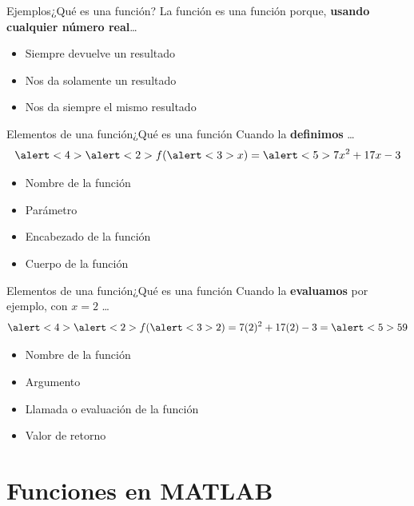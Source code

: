 \documentclass[spanish, c]{beamer}
\begin{document}
\begin{frame}{Ejemplos}{¿Qué es una función?}
    La función  es una función porque, \textbf{usando cualquier número real}\dots \pause

    \bigskip

    \begin{itemize}[<+->]
        \item Siempre devuelve un resultado
        \item Nos da solamente un resultado
        \item Nos da siempre el mismo resultado
    \end{itemize}
\end{frame}

\begin{frame}{Elementos de una función}{¿Qué es una función}
    Cuando la \textbf{definimos} \dots
$$\alert<4>{\alert<2>{f}(\alert<3>{x})} = \alert<5>{7x^2 + 17x - 3}$$ \pause

\begin{itemize}
    \item \alert<2>{Nombre de la función}
    \item \alert<3>{Parámetro}
    \item \alert<4>{Encabezado de la función}
    \item \alert<5>{Cuerpo de la función}    
\end{itemize}
\end{frame}

\begin{frame}{Elementos de una función}{¿Qué es una función}
    Cuando la \textbf{evaluamos} por ejemplo, con $x = 2$ \dots
$$\alert<4>{\alert<2>{f}(\alert<3>{2})} = 7(2)^2 + 17(2) - 3 = \alert<5>{59}$$ \pause

\begin{itemize}
    \item \alert<2>{Nombre de la función}
    \item \alert<3>{Argumento}
    \item \alert<4>{Llamada o evaluación de la función}
    \item \alert<5>{Valor de retorno}
\end{itemize}
\end{frame}

\section{Funciones en MATLAB}
\end{document}
